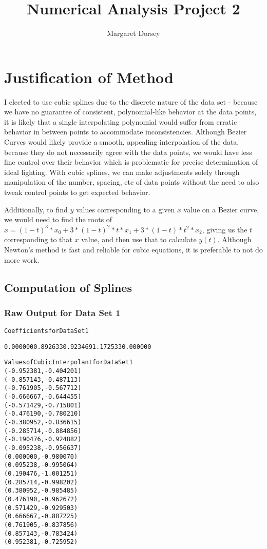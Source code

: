 \documentclass[11pt]{article} %
\title{Numerical Analysis Project 2}
\author{Margaret Dorsey}
\begin{document}
\maketitle

\section*{Justification of Method}
	I elected to use cubic splines due to the discrete nature of the data set - because we have no guarantee of consistent, polynomial-like behavior at the data points, it is likely that a single interpolating polynomial would suffer from erratic behavior in between points to accommodate inconsistencies. Although Bezier Curves would likely provide a smooth, appealing interpolation of the data, because they do not necessarily agree with the data points, we would have less fine control over their behavior which is problematic for precise determination of ideal lighting. With  cubic splines, we can make adjustments solely through manipulation of the number, spacing, etc of data points without the need to also tweak control points to get expected behavior.
\par Additionally, to find $y$ values corresponding to a given $x$ value on a Bezier curve, we would need to find the roots of $x = (1-t)^3*x_0 + 3*(1-t)^2*t*x_1 + 3*(1-t)*t^2*x_2$, giving us the $t$ corresponding to that $x$ value, and then use that to calculate $y(t)$. Although Newton's method is fast and reliable for cubic equations, it is preferable to not do more work.

\subsection*{Computation of Splines}
\subsubsection*{Raw Output for Data Set 1}
\begin{alltt}
Coefficients for Data Set 1

0.000000	0.892633	0.923469	1.172533	0.000000	

 Values of Cubic Interpolant for Data Set 1
(-0.952381, -0.404201)
(-0.857143, -0.487113)
(-0.761905, -0.567712)
(-0.666667, -0.644455)
(-0.571429, -0.715801)
(-0.476190, -0.780210)
(-0.380952, -0.836615)
(-0.285714, -0.884856)
(-0.190476, -0.924882)
(-0.095238, -0.956637)
(0.000000, -0.980070)
(0.095238, -0.995064)
(0.190476, -1.001251)
(0.285714, -0.998202)
(0.380952, -0.985485)
(0.476190, -0.962672)
(0.571429, -0.929503)
(0.666667, -0.887225)
(0.761905, -0.837856)
(0.857143, -0.783424)
(0.952381, -0.725952)
\end{alltt}
\end{document}
